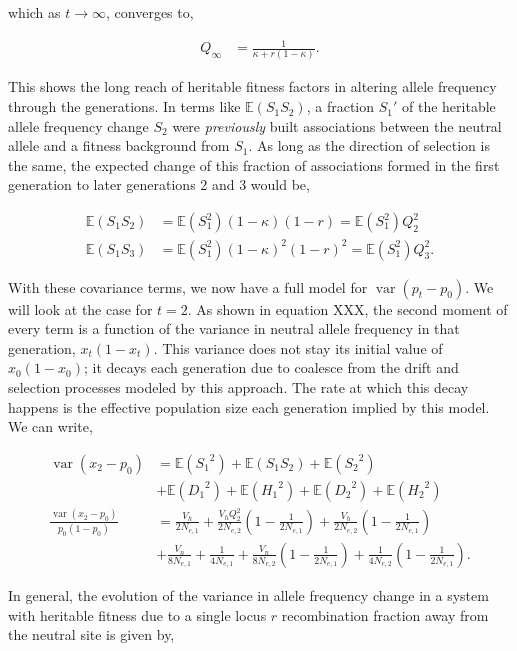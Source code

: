 \documentclass[11pt]{article}
\newcommand{\E}{\mathbb{E}}
\DeclareMathOperator{\var}{var}
\begin{document}
which as $t \to \infty$, converges to,

\begin{align}
  \label{eq:Qinf}
  Q_\infty &= \frac{1}{\kappa + r(1-\kappa)}.
\end{align}

This shows the long reach of heritable fitness factors in altering allele
frequency through the generations. In terms like $\E(S_1 S_2)$, a fraction
$S_1'$ of the heritable allele frequency change $S_2$ were \emph{previously}
built associations between the neutral allele and a fitness background from
$S_1$. As long as the direction of selection is the same, the expected change
of this fraction of associations formed in the first generation to later
generations 2 and 3 would be,

\begin{align}
  \E(S_1 S_2) &= \E(S_1^2) (1-\kappa)(1-r) = \E(S_1^2) Q_2^2 \\
  \E(S_1 S_3) &= \E(S_1^2) (1-\kappa)^2(1-r)^2 = \E(S_1^2) Q_3^2.
\end{align}

With these covariance terms, we now have a full model for $\var(p_t - p_0)$. We
will look at the case for $t=2$. As shown in equation XXX, the second moment of
every term is a function of the variance in neutral allele frequency in that
generation, $x_t(1-x_t)$. This variance does not stay its initial value of
$x_0(1-x_0)$; it decays each generation due to coalesce from the drift and
selection processes modeled by this approach. The rate at which this decay
happens is the effective population size each generation implied by this model. 
We can write,

\begin{align}
  \var(x_2 - p_0) &= \E({S_1}^2) + \E(S_1 S_2) + \E({S_2}^2) \\
                  & + \E({D_1}^2) + \E({H_1}^2) + \E({D_2}^2) + \E({H_2}^2) \\
  \frac{\var(x_2 - p_0)}{p_0(1-p_0)} &= \frac{V_h}{2N_{e,1}} + \frac{V_h Q_2^2}{2N_{e,2}}\left(1-\frac{1}{2N_{e,1}}\right)  +  \frac{V_h}{2N_{e,2}}  \left(1-\frac{1}{2N_{e,1}}\right)  \\ 
                                     &+ \frac{V_n}{8N_{e,1}} + \frac{1}{4N_{e,1}} + \frac{V_n}{8N_{e,2}}  \left(1 - \frac{1}{2N_{e,1}}\right) 
+ \frac{1}{4N_{e,2}} \left(1 - \frac{1}{2N_{e,1}}\right).
\end{align}

In general, the evolution of the variance in allele frequency change in a
system with heritable fitness due to a single locus $r$ recombination fraction
away from the neutral site is given by,
\end{document}
